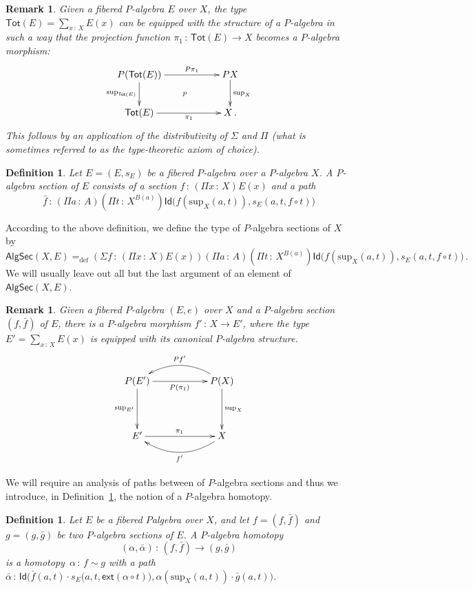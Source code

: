 \documentclass[10pt,a4paper,oneside,reqno]{amsart}
\theoremstyle{mythm}
\theoremstyle{mydef}
\newtheorem{definition}[theorem]{Definition}
\theoremstyle{myrmk}
\newtheorem{remark}[theorem]{Remark}
\newtheorem*{remark*}{Remark}
\newcommand{\ie}{\text{i.e.\ }}
\newcommand{\defeq}{=_{\mathrm{def}}}
\newcommand{\co}{\,{:}\,}
\newcommand{\ct}{\cdot}
\newcommand{\ext}{\mathsf{ext}}
\newcommand{\Id}{\mathsf{Id}}
\newcommand{\Tot}{\mathsf{Tot}}
\renewcommand{\sup}{\mathrm{sup}}
\newcommand{\PalgSec}{\mathsf{AlgSec}}
\begin{document}
\begin{remark}\label{thm:fibalg}
Given a fibered $P$-algebra $E$ over $X$, the type $\Tot(E) =  \sum_{x \co  X} E(x)$ can be equipped with the structure of a $P$-algebra in such a way that  the projection function $\pi_1 \co \Tot(E) \to X$ becomes a $P$-algebra morphism:
\[
\xymatrix@C=2cm{
P(\Tot(E)) \ar[r]^-{P\pi_1} \ar[d]_-{\sup_{\Tot(E)}} \ar@{}[rd]|{p} & PX \ar[d]^{\sup_X} \\ 
\Tot(E)  \ar[r]_-{\pi_1} & X \, .}
 \]
 This follows by an application of the distributivity of $\Sigma$ and $\Pi$ (\ie what is sometimes
referred to as the type-theoretic axiom of choice). 
\end{remark}

\begin{definition} \label{def:fibalgsection} Let $E = (E, s_E)$ be a fibered $P$-algebra over a $P$-algebra $X$.  
A \emph{$P$-algebra section} of $E$ consists of a section $f \co (\Pi x \co X) E(x)$ and a path
\[ 
\bar{f} \co (\Pi a \co A) (\Pi t \co X^{B(a)}) \Id \big( f(\sup_X(a,t)), s_E(a, t, f \circ t) \big)
\]
\end{definition} 

According to the above definition, we define the type of $P$-algebra sections of $X$ by
\[ 
\PalgSec(X,E)  \defeq (\Sigma f  \co (\Pi x \co X) E(x)) (\Pi a \co A) (\Pi t \co  X^{B(a)} ) 
\Id\big(   f(\sup_X(a,t)) ,  s_E(a,t,f  \circ t) \big) \, .
\]
We will usually leave out all but the last argument of an element of $\PalgSec(X,E)$. 



\begin{remark*}
Given a fibered $P$-algebra $(E, e)$ over $X$ and a $P$-algebra section $(f, \bar{f})$ of $E$, there is a $P$-algebra 
morphism $f' \co X \to E'$, where the type $E' = \sum_{x \co X} E(x)$ is equipped with its canonical 
$P$-algebra structure. 
\[
\xymatrix@C=2cm@R=1.5cm{
P(E')  \ar[d]_-{\sup_{E'}}   \ar[r]_{P(\pi_1)}   & P(X)  \ar[d]^-{\sup_X}   \ar@/_1.4pc/[l]_{Pf'}  \\ 
E'  \ar[r]^{\pi_1}    & X \ar@/^1.4pc/[l]^{f'} }
 \]
\end{remark*}



We will require an analysis of paths between of $P$-algebra sections and thus we introduce, in Definition~\ref{def:W2cellsection}, the
notion of a $P$-algebra homotopy.

\begin{definition} \label{def:W2cellsection} Let $E$ be a fibered $P$algebra over $X$, and let $f = (f, \bar{f})$ and $g = (g, \bar{g})$ be two $P$-algebra sections of $E$.  A \emph{$P$-algebra homotopy} 
\[
(\alpha , \bar{\alpha}) \co (f, \bar{f})  \rightarrow (g, \bar{g})
\] 
is a homotopy~$\alpha \co f \sim g$ with a path
$\bar{\alpha} \co 
\Id\big( \bar{f}(a,t)  \ct s_E\big(a,t, \ext (\alpha \circ t) \big),
\alpha(\sup_X(a,t)) \ct \bar{g}(a,t) \big)$. 
\end{definition} 
\end{document}
